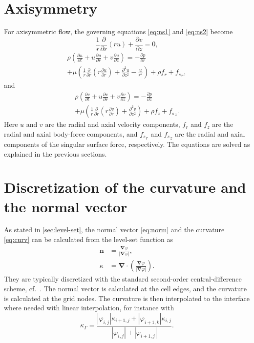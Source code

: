 \documentclass[11pt,b5paper,DIV=calc,BCOR1.3cm,headings=small,%
               footinclude=false,headsepline]{scrbook}
\newcommand*{\pdt}[1]{\ensuremath{\frac{\partial #1}{\partial t}}}
\newcommand*{\pd}[2]{\ensuremath{\frac{\partial #1}{\partial{#2}}}}
\newcommand*{\pdd}[2]{\ensuremath{\frac{\partial^2 #1}{\partial{#2}^2}}}
\newcommand*{\vct}[1]{\ensuremath{\boldsymbol{#1}}}
\newcommand*{\del}{\boldsymbol\nabla}
\renewcommand*{\div}{\del\cdot}
\newcommand*{\grad}{\del}
\begin{document}
\section{Axisymmetry}
For axisymmetric flow, the governing equations \eqref{eq:ns1} and
\eqref{eq:ns2} become
\begin{equation}
  \frac 1 r \pd{} r\left(r u\right) + \pd v z = 0,
\end{equation}
\begin{multline}
  \rho\left(\pdt u + u\pd u r + v\pd u z\right) = -\pd p r \\
    + \mu\left(\frac 1 r \pd{} r\left(r \pd u r\right)
          + \pdd u z - \frac u {r^2}\right) + \rho f_r + {f_s}_r,
\end{multline}
and
\begin{multline}
  \rho\left(\pdt v + u\pd v r + v\pd v z\right) = -\pd p z \\
    + \mu\left(\frac 1 r \pd{} r\left(r \pd v r\right)
      + \pdd v z\right) + \rho f_z + {f_s}_z.
\end{multline}
Here $u$ and $v$ are the radial and axial velocity components, $f_r$ and $f_z$
are the radial and axial body-force components, and ${f_s}_r$ and ${f_s}_z$ are
the radial and axial components of the singular surface force, respectively.
The equations are solved as explained in the previous sections.

\section{Discretization of the curvature and the normal vector}
\label{sec:curvature}
As stated in \cref{sec:level-set}, the normal vector \eqref{eq:norm} and the
curvature \eqref{eq:curv} can be calculated from the level-set function as
\begin{align*}
  \vct n &= \frac{\grad\varphi}{|\grad\varphi|}, \\
  \kappa &= \div\left(\frac{\grad\varphi}{|\grad\varphi|}\right).
\end{align*}
They are typically discretized with the standard second-order
central-difference scheme, cf.\ \cite{Kang00,Sethian03,Xu06}.  The normal
vector is calculated at the cell edges, and the curvature is calculated at the
grid nodes.  The curvature is then interpolated to the interface where needed
with linear interpolation, for instance with
\begin{equation}
  \kappa_\Gamma = \frac{|\varphi_{i,j}|\kappa_{i+1,j}
  + |\varphi_{i+1,k}|\kappa_{i,j}}{|\varphi_{i,j}| + |\varphi_{i+1,j}|}.
  \label{eq:curvature-gamma}
\end{equation}
\end{document}
